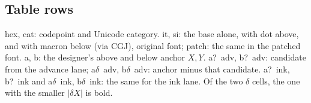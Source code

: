 \documentclass[landscape]{article}
\begin{document}
{\footnotesize

}

\subsection*{Table rows}

hex, cat: codepoint and Unicode category.
it, si: the base alone, with dot above, and with macron below (via CGJ), original font; patch: the same in the patched font.
a, b: the designer's above and below anchor $X, Y$.
a?~adv, b?~adv: candidate from the advance lane; a$\delta$~adv, b$\delta$~adv: anchor minus that candidate.
a?~ink, b?~ink and a$\delta$~ink, b$\delta$~ink: the same for the ink lane.
Of the two $\delta$ cells, the one with the smaller $|\delta X|$ is bold.

\clearpage






\end{document}
